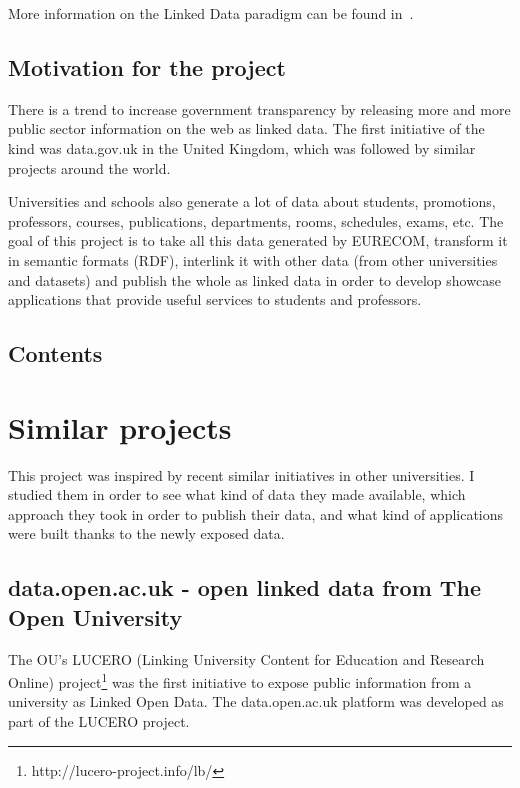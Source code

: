 \documentclass[a4paper,11pt]{report}
\begin{document}
More information on the Linked Data paradigm can be found in~\cite{Heath2011}. 

\section*{Motivation for the project}
There is a trend to increase government transparency by releasing more and more public sector information on the web as linked data. The first initiative of the kind was data.gov.uk in the United Kingdom, which was followed by similar projects around the world. 

Universities and schools also generate a lot of data about students, promotions, professors, courses, publications, departments, rooms, schedules, exams, etc. The goal of this project is to take all this data generated by EURECOM, transform it in semantic formats (RDF), interlink it with other data (from other universities and datasets) and publish the whole as linked data in order to develop showcase applications that provide useful services to students and professors. %

\section*{Contents}

\chapter{Similar projects}

This project was inspired by recent similar initiatives in other universities. I studied them in order to see what kind of data they made available, which approach they took in order to publish their data, and what kind of applications were built thanks to the newly exposed data. 
\section*{data.open.ac.uk - open linked data from The Open University}
The OU's LUCERO (Linking University Content for Education and Research Online) project\footnote{http://lucero-project.info/lb/} was the first initiative to expose public information from a university as Linked Open Data. The data.open.ac.uk platform was developed as part of the LUCERO project. 
\end{document}
